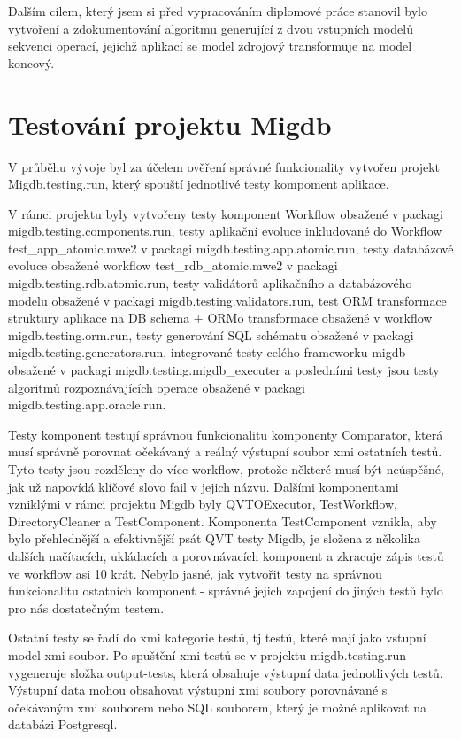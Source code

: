 \documentclass[11pt,twoside,a4paper]{book}
\begin{document}
Dalším cílem, který jsem si před vypracováním diplomové práce stanovil bylo
vytvoření a zdokumentování algoritmu generující z dvou vstupních modelů
sekvenci operací, jejichž aplikací se model zdrojový transformuje na model
koncový.

\chapter{Testování projektu Migdb}\label{chapt:testování}

V průběhu vývoje byl za účelem ověření správné funkcionality vytvořen projekt
Migdb.testing.run, který spouští jednotlivé testy kompoment aplikace. 

V rámci projektu byly vytvořeny testy komponent Workflow obsažené v packagi
migdb.testing.components.run, testy aplikační evoluce inkludované do Workflow
test\_app\_atomic.mwe2 v packagi migdb.testing.app.atomic.run, testy databázové
evoluce obsažené workflow test\_rdb\_atomic.mwe2 v packagi
migdb.testing.rdb.atomic.run, testy validátorů aplikačního a databázového
modelu obsažené v packagi migdb.testing.validators.run, test ORM transformace
struktury aplikace na DB schema + ORMo transformace obsažené v workflow
migdb.testing.orm.run, testy generování SQL schématu obsažené v packagi
migdb.testing.generators.run, integrované testy celého frameworku migdb
obsažené v packagi migdb.testing.migdb\_executer a posledními testy jsou testy
algoritmů rozpoznávajících operace obsažené v packagi
migdb.testing.app.oracle.run.

Testy komponent testují správnou funkcionalitu komponenty Comparator, která
musí správně porovnat očekávaný a reálný výstupní soubor xmi ostatních testů.
Tyto testy jsou rozděleny do více workflow, protože některé musí být neúspěšné,
jak už napovídá klíčové slovo fail v jejich názvu. Dalšími komponentami
vzniklými v rámci projektu Migdb byly QVTOExecutor, TestWorkflow,
DirectoryCleaner a TestComponent. Komponenta TestComponent vznikla, aby bylo
přehlednější a efektivnější psát QVT testy Migdb, je složena z několika dalších
načítacích, ukládacích a porovnávacích komponent a zkracuje zápis testů ve
workflow asi 10 krát. Nebylo jasné, jak vytvořit testy na správnou funkcionalitu
ostatních komponent - správné jejich zapojení do jiných testů bylo pro nás
dostatečným testem.

Ostatní testy se řadí do xmi kategorie testů, tj testů, které mají jako
vstupní model xmi soubor. Po spuštění xmi testů se v projektu
migdb.testing.run vygeneruje složka output-tests, která obsahuje výstupní data 
jednotlivých testů. Výstupní data mohou obsahovat výstupní xmi soubory
porovnávané s očekávaným xmi souborem nebo SQL souborem, který je možné
aplikovat na databázi Postgresql.
\end{document}
